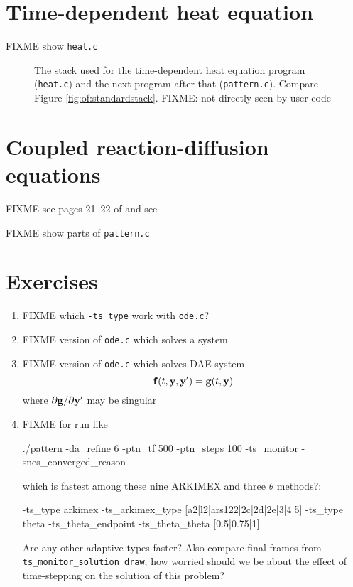 \section{Time-dependent heat equation}

FIXME show \texttt{heat.c}

\begin{figure}
\caption{The \PETSc stack used for the time-dependent heat equation program (\texttt{heat.c}) and the next program after that (\texttt{pattern.c}).  Compare Figure \ref{fig:of:standardstack}.  FIXME: \pSNES not directly seen by user code}
\label{fig:of:tsstack}
\end{figure}


\section{Coupled reaction-diffusion equations}

FIXME see pages 21--22 of \citep{HundsdorferVerwer2003} and see \citep{Pearson1993}

FIXME show parts of \texttt{pattern.c}


\section{Exercises}

\renewcommand{\labelenumi}{\arabic{chapter}.\arabic{enumi}\quad}
\renewcommand{\labelenumii}{(\alph{enumii})}
\begin{enumerate}
\item FIXME which \texttt{-ts\_type} work with \texttt{ode.c}?
\item FIXME version of \texttt{ode.c} which solves a system
\item FIXME version of \texttt{ode.c} which solves DAE system
    $$\mathbf{f}(t,\mathbf{y},\mathbf{y}') = \mathbf{g}(t,\mathbf{y})$$
where $\partial \mathbf{g}/\partial \mathbf{y}'$ may be singular
\item FIXME for run like
\begin{cline}
./pattern -da_refine 6 -ptn_tf 500 -ptn_steps 100 -ts_monitor -snes_converged_reason
\end{cline}
which is fastest among these nine ARKIMEX and three $\theta$ methods?:
\begin{code}
-ts_type arkimex -ts_arkimex_type [a2|l2|ars122|2c|2d|2e|3|4|5]
-ts_type theta -ts_theta_endpoint -ts_theta_theta [0.5|0.75|1]
\end{code}
Are any other adaptive \pTS types faster?  Also compare final frames from \texttt{-ts\_monitor\_solution draw}; how worried should we be about the effect of time-stepping on the solution of this problem?
\end{enumerate}
